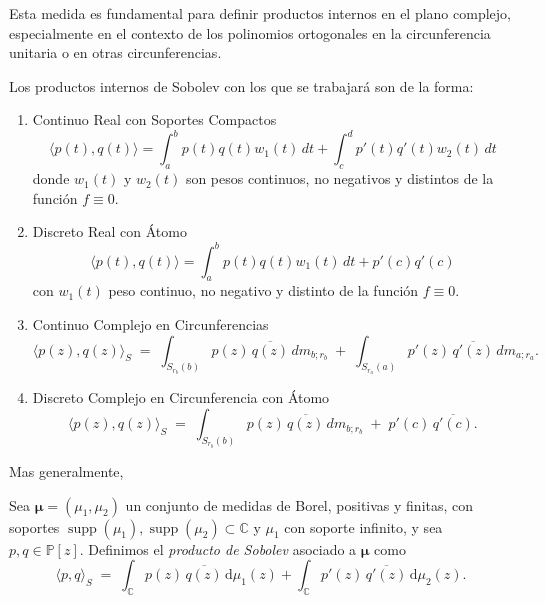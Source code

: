 Esta medida es fundamental para definir productos internos en el plano complejo, especialmente en el contexto de los polinomios ortogonales en la circunferencia unitaria o en otras circunferencias.

Los productos internos de Sobolev con los que se trabajará son de la forma:
\begin{enumerate}
  \item Continuo Real con Soportes Compactos
        \begin{equation}
          \langle p(t), q(t) \rangle = \int_{a}^{b} p(t) q(t) w_1(t) \, dt + \int_{c}^{d} p'(t) q'(t) w_2(t) \, dt
        \end{equation}
        donde $w_1(t)$ y $w_2(t)$ son pesos continuos, no negativos y distintos de la función $f \equiv 0$.
  \item Discreto Real con Átomo
        \begin{equation}
          \langle p(t), q(t) \rangle = \int_{a}^{b} p(t) q(t) w_1(t) \, dt + p'(c) q'(c)
        \end{equation}
        con $w_1(t)$ peso continuo, no negativo y distinto de la función $f \equiv 0$.
  \item Continuo Complejo en Circunferencias
        \begin{equation}
          \langle p(z) , q(z) \rangle_{S}\;=\;
          \int_{S_{r_b}(b)}     p(z)\,\overline{q(z)} \, dm_{b;r_b}
          \;+\;
          \int_{S_{r_a}(a)}
          p'(z)\,\overline{q'(z)} \, dm_{a;r_a}.
        \end{equation}
  \item Discreto Complejo en Circunferencia con Átomo
        \begin{equation}
          \langle p(z) , q(z) \rangle_{S}\;=\;
          \int_{S_{r_b}(b)} p(z)\,\overline{q(z)}\,dm_{b;r_b}
          \;+\;
          p'(c)\,\overline{q'(c)}.
        \end{equation}
\end{enumerate}

Mas generalmente,
\begin{definition}\label{def:sobolev_product}
  \cite{escribano2025boundedness}
  Sea \(\boldsymbol{\mu}=(\mu_1,\mu_2)\) un conjunto de medidas de Borel,
  positivas y finitas, con soportes \(\operatorname{supp}(\mu_1),\operatorname{supp}(\mu_2)\subset\mathbb C\) y \( \mu_1\) con soporte infinito,
  y sea \(p,q\in\mathbb P[z]\).
  Definimos el \emph{producto de Sobolev} asociado a
  \(\boldsymbol{\mu}\) como
  \[
    \langle p,q \rangle_{S}
    \;=\;
    \int_{\mathbb C} p(z)\,\overline{q(z)}\,\mathrm d\mu_{1}(z) + \int_{\mathbb C} p'(z)\,\overline{q'(z)}\,\mathrm d\mu_{2}(z).
  \]
\end{definition}

